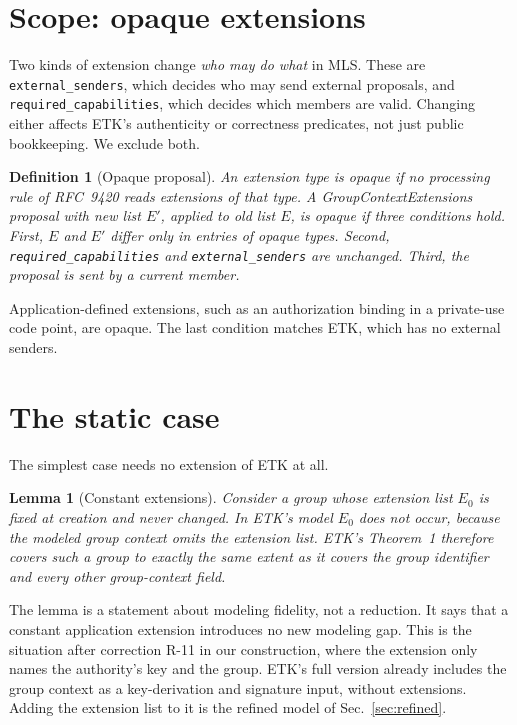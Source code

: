 \documentclass[aps,prx,reprint,superscriptaddress,nofootinbib,floatfix]{revtex4-2}
\newtheorem{lemma}{Lemma}
\newtheorem{definition}{Definition}
\theoremstyle{remark}
\begin{document}
\section{Scope: opaque extensions}

Two kinds of extension change \emph{who may do what} in MLS. These are \texttt{external\_senders}, which decides who may send external proposals, and \texttt{required\_capabilities}, which decides which members are valid. Changing either affects ETK's authenticity or correctness predicates, not just public bookkeeping. We exclude both.

\begin{definition}[Opaque proposal]
An extension type is \emph{opaque} if no processing rule of RFC~9420 reads extensions of that type. A GroupContextExtensions proposal with new list $E'$, applied to old list $E$, is \emph{opaque} if three conditions hold. First, $E$ and $E'$ differ only in entries of opaque types. Second, \texttt{required\_capabilities} and \texttt{external\_senders} are unchanged. Third, the proposal is sent by a current member.
\end{definition}

Application-defined extensions, such as an authorization binding in a private-use code point, are opaque. The last condition matches ETK, which has no external senders.

\section{The static case}

The simplest case needs no extension of ETK at all.

\begin{lemma}[Constant extensions]\label{lem:static}
Consider a group whose extension list $E_0$ is fixed at creation and never changed. In ETK's model $E_0$ does not occur, because the modeled group context omits the extension list. ETK's Theorem~1 therefore covers such a group to exactly the same extent as it covers the group identifier and every other group-context field.
\end{lemma}

The lemma is a statement about modeling fidelity, not a reduction. It says that a constant application extension introduces no new modeling gap. This is the situation after correction R-11 in our construction, where the extension only names the authority's key and the group. ETK's full version already includes the group context as a key-derivation and signature input, without extensions. Adding the extension list to it is the refined model of Sec.~\ref{sec:refined}.
\end{document}
